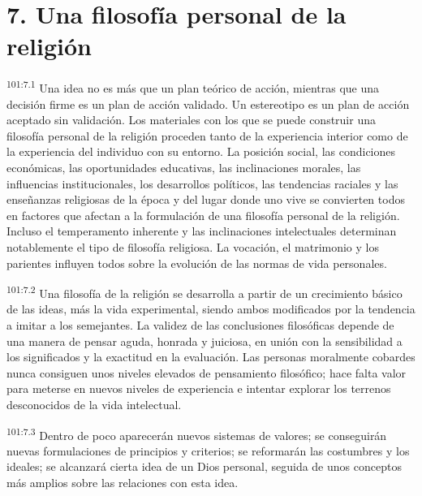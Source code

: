 \documentclass[twoside, 11pt]{book}
\begin{document}
\section*{7. Una filosofía personal de la religión}
\par
\textsuperscript{101:7.1} Una idea no es más que un plan teórico de acción, mientras que una decisión firme es un plan de acción validado. Un estereotipo es un plan de acción aceptado sin validación. Los materiales con los que se puede construir una filosofía personal de la religión proceden tanto de la experiencia interior como de la experiencia del individuo con su entorno. La posición social, las condiciones económicas, las oportunidades educativas, las inclinaciones morales, las influencias institucionales, los desarrollos políticos, las tendencias raciales y las enseñanzas religiosas de la época y del lugar donde uno vive se convierten todos en factores que afectan a la formulación de una filosofía personal de la religión. Incluso el temperamento inherente y las inclinaciones intelectuales determinan notablemente el tipo de filosofía religiosa. La vocación, el matrimonio y los parientes influyen todos sobre la evolución de las normas de vida personales.

\par
\textsuperscript{101:7.2} Una filosofía de la religión se desarrolla a partir de un crecimiento básico de las ideas, más la vida experimental, siendo ambos modificados por la tendencia a imitar a los semejantes. La validez de las conclusiones filosóficas depende de una manera de pensar aguda, honrada y juiciosa, en unión con la sensibilidad a los significados y la exactitud en la evaluación. Las personas moralmente cobardes nunca consiguen unos niveles elevados de pensamiento filosófico; hace falta valor para meterse en nuevos niveles de experiencia e intentar explorar los terrenos desconocidos de la vida intelectual.

\par
\textsuperscript{101:7.3} Dentro de poco aparecerán nuevos sistemas de valores; se conseguirán nuevas formulaciones de principios y criterios; se reformarán las costumbres y los ideales; se alcanzará cierta idea de un Dios personal, seguida de unos conceptos más amplios sobre las relaciones con esta idea.
\end{document}
